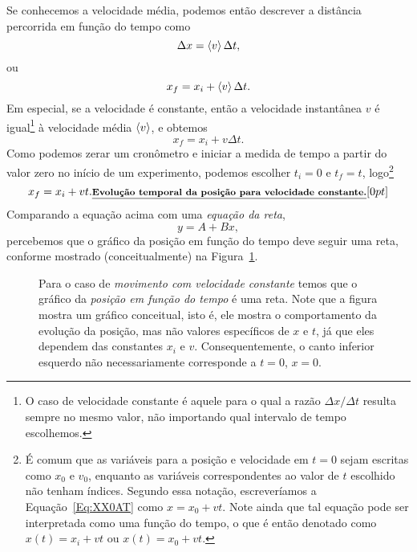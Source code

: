 Se conhecemos a velocidade média, podemos então descrever a distância percorrida em função do tempo como
\begin{equation}
  \Delta x = \left\langle{v}\right\rangle \Delta t,
\end{equation}
%
ou
\begin{equation}
    x_f = x_i + \left\langle{v}\right\rangle \Delta t.
\end{equation}
%
Em especial, se a velocidade é constante, então a velocidade instantânea $v$ é igual\footnote[][-5cm]{O caso de velocidade constante é aquele para o qual a razão $\Delta x / \Delta t$ resulta sempre no mesmo valor, não importando qual intervalo de tempo escolhemos.} à velocidade média $\left\langle{v}\right\rangle$, e obtemos
\begin{equation}
    x_f = x_i + v \Delta t.
\end{equation}
%
Como podemos zerar um cronômetro e iniciar a medida de tempo a partir do valor zero no início de um experimento, podemos escolher $t_i = 0$ e $t_f = t$, logo\footnote[][-5cm]{É comum que as variáveis para a posição e velocidade em $t = 0$ sejam escritas como $x_0$ e $v_0$, enquanto as variáveis correspondentes ao valor de $t$ escolhido não tenham índices. Segundo essa notação, escreveríamos a Equação~\eqref{Eq:XX0AT} como $x = x_0 + vt$. Note ainda que tal equação pode ser interpretada como uma função do tempo, o que é então denotado como $x(t) = x_i + vt$ ou $x(t) = x_0 + vt$.}
\begin{equation}\label{Eq:XX0AT}
  x_f = x_i + vt.\relax{\footnotesize\emph{\textbf{Evolução temporal da posição para velocidade constante.}}}[0pt]
\end{equation}
%
Comparando a equação acima com uma \emph{equação da reta},
\begin{equation}
    y = A + Bx,
\end{equation}
%
percebemos que o gráfico da posição em função do tempo deve seguir uma reta, conforme mostrado (conceitualmente) na Figura~\ref{Fig:GraficoGenericoEvolPosicaoComoReta}.

\begin{figure}[!h]\forceversofloat
\centering
{}
\caption{Para o caso de \emph{movimento com velocidade constante} temos que o gráfico da \emph{posição em função do tempo} é uma reta. Note que a figura mostra um gráfico conceitual, isto é, ele mostra o comportamento da evolução da posição, mas não valores específicos de $x$ e $t$, já que eles dependem das constantes $x_i$ e $v$. Consequentemente, o canto inferior esquerdo não necessariamente corresponde a $t=0$, $x=0$. \label{Fig:GraficoGenericoEvolPosicaoComoReta}}
\end{figure}

